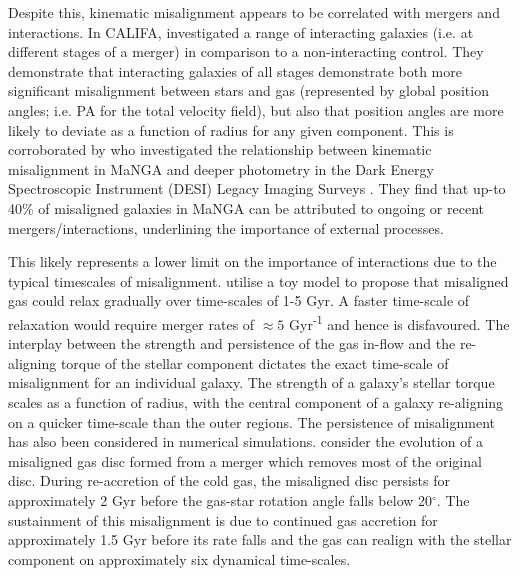 Despite this, kinematic misalignment appears to be correlated with mergers and interactions. In CALIFA, \citet[][]{barrera2015} investigated a range of interacting galaxies (i.e. at different stages of a merger) in comparison to a non-interacting control. They demonstrate that interacting galaxies of all stages demonstrate both more significant misalignment between stars and gas (represented by global position angles; i.e. PA for the total velocity field), but also that position angles are more likely to deviate as a function of radius for any given component. This is corroborated by \citet{li_decoupling2019} who investigated the relationship between kinematic misalignment in MaNGA and deeper photometry in the Dark Energy Spectroscopic Instrument (DESI) Legacy Imaging Surveys \citep{dey2019}. They find that up-to 40\% of misaligned galaxies in MaNGA can be attributed to ongoing or recent mergers/interactions, underlining the importance of external processes. 

This likely represents a lower limit on the importance of interactions due to the typical timescales of misalignment. \citet{davis2016} utilise a toy model to propose that misaligned gas could relax gradually over time-scales of 1-5 Gyr. A faster time-scale of relaxation would require merger rates of $\approx 5$ Gyr\textsuperscript{-1} and hence is disfavoured. The interplay between the strength and persistence of the gas in-flow and the re-aligning torque of the stellar component dictates the exact time-scale of misalignment for an individual galaxy. The strength of a galaxy's stellar torque scales as a function of radius, with the central component of a galaxy re-aligning on a quicker time-scale than the outer regions. The persistence of misalignment has also been considered in numerical simulations. \citet{vdvoort2015} consider the evolution of a misaligned gas disc formed from a merger which removes most of the original disc. During re-accretion of the cold gas, the misaligned disc persists for approximately 2 Gyr before the gas-star rotation angle falls below 20$^{\circ}$. The sustainment of this misalignment is due to continued gas accretion for approximately 1.5 Gyr before its rate falls and the gas can realign with the stellar component on approximately six dynamical time-scales. 

